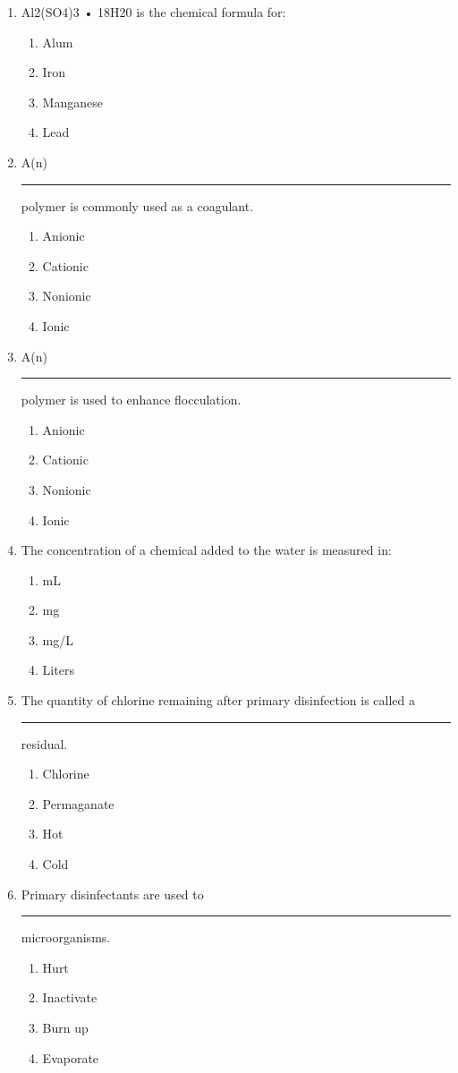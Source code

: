 \documentclass[10pt]{article}
\begin{document}
\begin{enumerate}
\begin{enumerate}
\item Al2(SO4)3 • 18H20 is the chemical formula for:
\begin{enumerate}
\item Alum
\item Iron
\item Manganese
\item Lead
\end{enumerate}

\item A(n) \rule{1cm}{0.5pt}  polymer is commonly used as a coagulant.
\begin{enumerate}
\item Anionic
\item Cationic
\item Nonionic
\item Ionic
\end{enumerate}

\item A(n) \rule{1cm}{0.5pt}  polymer is used to enhance flocculation.
\begin{enumerate}
\item Anionic
\item Cationic
\item Nonionic
\item Ionic
\end{enumerate}

\item The concentration of a chemical added to the water is measured in:
\begin{enumerate}
\item mL
\item mg
\item mg/L
\item Liters
\end{enumerate}

\item The quantity of chlorine remaining after primary disinfection is called a
\rule{1cm}{0.5pt}  residual.
\begin{enumerate}
\item Chlorine
\item Permaganate
\item Hot
\item Cold
\end{enumerate}

\item Primary disinfectants are used to \rule{1cm}{0.5pt}  microorganisms.
\begin{enumerate}
\item Hurt
\item Inactivate
\item Burn up
\item Evaporate
\end{enumerate}


\end{enumerate}
\end{enumerate}
\end{document}
